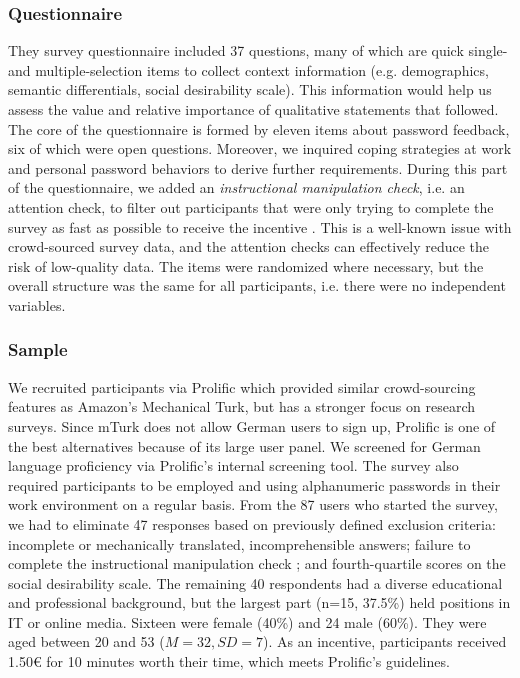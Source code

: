 \subsubsection{Questionnaire}
They survey questionnaire included 37 questions, many of which are quick single- and multiple-selection items to collect context information (e.g. demographics, semantic differentials, social desirability scale). This information would help us assess the value and relative importance of qualitative statements that followed. The core of the questionnaire is formed by eleven items about password feedback, six of which were open questions. Moreover, we inquired coping strategies at work and personal password behaviors to derive further requirements. During this part of the questionnaire, we added an \textit{instructional manipulation check}, i.e. an attention check, to filter out participants that were only trying to complete the survey as fast as possible to receive the incentive \cite{Oppenheimer2009InstructionalManipulationChecks}. This is a well-known issue with crowd-sourced survey data, and the attention checks can effectively reduce the risk of low-quality data. The items were randomized where necessary, but the overall structure was the same for all participants, i.e. there were no independent variables. 

\subsubsection{Sample}
We recruited participants via Prolific  which provided similar crowd-sourcing features as Amazon's Mechanical Turk, but has a stronger focus on research surveys. Since \gls{mTurk} does not allow German users to sign up, Prolific is one of the best alternatives because of its large user panel. We screened for German language proficiency via Prolific's internal screening tool. The survey also required participants to be employed and using alphanumeric passwords in their work environment on a regular basis. 
From the 87 users who started the survey, we had to eliminate 47 responses based on previously defined exclusion criteria: incomplete or mechanically translated, incomprehensible answers; failure to complete the instructional manipulation check \cite{Oppenheimer2009InstructionalManipulationChecks}; and fourth-quartile scores on the social desirability scale. The remaining 40 respondents had a diverse educational and professional background, but the largest part (n=15, 37.5\%) held positions in IT or online media. Sixteen were female (40\%) and 24 male (60\%). They were aged between 20 and 53 ($M=32, SD=7$). As an incentive, participants received 1.50€ for 10 minutes worth their time, which meets Prolific's guidelines. 


